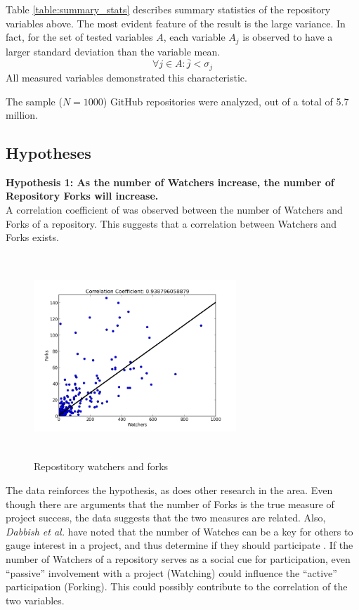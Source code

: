\documentclass{proc}
\begin{document}
{{{{{{{Table \ref{table:summary_stats} describes summary statistics of the repository variables above. The most evident feature of the result is the large variance. In fact, for the set of tested variables $A$, each variable $A_j$ is observed to have a larger standard deviation than the variable mean.
\begin{equation}
\forall j \in A \colon \overline{j} < \sigma_{j}
\label{eq:variance}
\end{equation}
All measured variables demonstrated this characteristic.

The sample ($N = 1000$) GitHub repositories were analyzed, out of a total of 5.7 million\cite{githubPress}.

\subsection{Hypotheses}
\textbf{Hypothesis 1: As the number of Watchers increase, the number of Repository Forks will increase.}\\
A correlation coefficient of  was observed between the number of Watchers and Forks of a repository. This suggests that a correlation between Watchers and Forks exists.

\begin{figure}
\includegraphics[height=3in,width=3in]{images/watcher_forks_scatterplot.png}
\caption{Repostitory watchers and forks}
\end{figure}

The data reinforces the hypothesis, as does other research in the area. Even though there are arguments that the number of Forks is the true measure of project success\cite{baudry2012towards}, the data suggests that the two measures are related. Also, \textit{Dabbish et al.} have noted that the number of Watches can be a key for others to gauge interest in a project, and thus determine if they should participate \cite{dabbish2013leveraging}. If the number of Watchers of a repository serves as a social cue for participation, even ``passive'' involvement with a project (Watching) could influence the ``active'' participation (Forking). This could possibly contribute to the correlation of the two variables.\\

}}}}}}}
\end{document}
